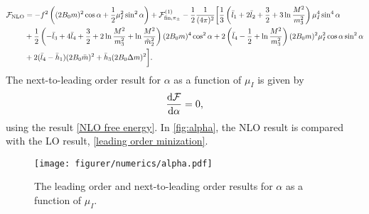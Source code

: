 \begin{align}
    \nonumber
    \mathcal{F}_{\mathrm{NLO}} &=
    - f^2 \left((2 B_0 m)^2 \cos \alpha + \frac{1}{2}\mu_I^2 \sin^2 \alpha\right)
    + \mathcal{F}^{(1)}_{\mathrm{fin}, \pi_\pm}
    - \frac{1}{2}\frac{1}{(4 \pi)^2}
    \bigg[
        \frac{1}{3}
        \left( 
            \bar l_1 + 2 \bar l_2 + \frac{3}{2} + 3 \ln \frac{M^2}{m_3^2}
        \right) \mu_I^4 \sin^4 \alpha
        \\ \nonumber
        &
        +
        \frac{1}{2}
        \left(
            - \bar l_3 + 4 \bar l_4 + \frac{3}{2} + 2\ln \frac{M^2}{m_3^2}
            + \ln \frac{M^2}{\tilde m^2_2}
        \right) (2 B_0 m)^4 \cos^2\alpha 
        + 2 \left(\bar l_4 - \frac{1}{2} + \ln \frac{M^2}{m_3^2}\right)
        (2 B_0 m)^2 \mu_I^2 \cos\alpha \sin^2 \alpha
        \\ \label{NLO free energy}
        & 
        + 2 (\bar l_4 - \bar h_1) (2B_0 \bar m )^2
        + \bar h_3 (2B_0 \Delta m)^2
    \bigg].
\end{align}
The next-to-leading order result for $\alpha$ as a function of $\mu_I$ is given by 
\begin{eqnarray}
    \diff{\Ef}{\alpha} = 0,
\end{eqnarray}
using the result \cref{NLO free energy}.
In \autoref{fig:alpha}, the NLO result is compared with the LO result, \cref{leading order minization}.

\begin{figure}
    \centering
    \texttt{[image: figurer/numerics/alpha.pdf]}
    \caption{The leading order and next-to-leading order results for $\alpha$ as a function of $\mu_I$.}
    \label{fig:alpha}
\end{figure}

